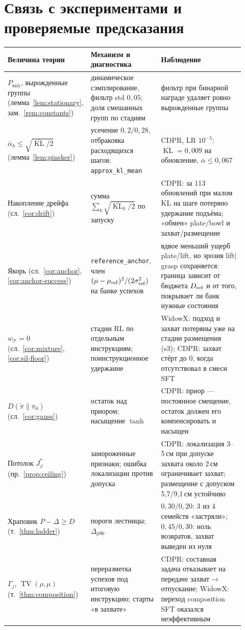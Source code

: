 \documentclass[11pt,a4paper]{article}
\theoremstyle{plain}
\theoremstyle{definition}
\theoremstyle{remark}
\DeclareMathOperator{\TV}{TV}
\DeclareMathOperator{\KL}{KL}
\newcommand{\cT}{\mathcal{T}}
\newcommand{\Pmix}{P_{\mathrm{mix}}}
\newcommand{\ab}{\bar\alpha}
\newcommand{\pit}{\tilde\pi}
\begin{document}
\section{Связь с экспериментами и проверяемые предсказания}\label{sec:experiments}

\begin{longtable}{>{\raggedright}p{0.24\linewidth}>{\raggedright}p{0.30\linewidth}>{\raggedright\arraybackslash}p{0.38\linewidth}}
\toprule
Величина теории & Механизм и диагностика & Наблюдение \\
\midrule\endhead
$\Pmix$, вырожденные группы (лемма~\ref{lem:stationary}, зам.~\ref{rem:constants}) & динамическое сэмплирование, фильтр std $0{,}05$; доля смешанных групп по стадиям & фильтр при бинарной награде удаляет ровно вырожденные группы \\
$\ab_h\le\sqrt{\overline{\KL}/2}$ (лемма~\ref{lem:pinsker}) & усечение $0{,}2/0{,}28$, отбраковка расходящихся шагов; \texttt{approx\_kl\_mean} & CDPR, LR $10^{-5}$: $\overline{\KL}=0{,}009$ на обновление, $\ab\le0{,}067$ \\
Накопление дрейфа (сл.~\ref{cor:drift}) & сумма $\sum_k\sqrt{\overline{\KL}_k/2}$ по запуску & CDPR: за 113 обновлений при малом KL на шаге потеряно удержание подъёма; «обмен» plate/bowl и захват/размещение \\
Якорь (сл.~\ref{cor:anchor}, \ref{cor:anchor-success}) & \texttt{reference\_anchor}, член $(\mu-\mu_{\rm ref})^2/(2\sigma^2_{\rm ref})$ на банке успехов & вдвое меньший ущерб plate/lift, но эрозия lift$\mid$grasp сохраняется: граница зависит от бюджета $D_{\rm ref}$ и от того, покрывает ли банк нужные состояния \\
$w_\cT=0$ (сл.~\ref{cor:mixture}, \ref{cor:sil-floor}) & стадии RL по отдельным инструкциям; поинструкционное удержание & WidowX: подход и захват потеряны уже на стадии размещения (s3); CDPR: захват стёрт до 0, когда отсутствовал в смеси SFT \\
$D(\pit\|\pi_0)$ (сл.~\ref{cor:gauss}) & остаток над приором; насыщение $\tanh$ & CDPR: приор --- постоянное смещение, остаток должен его компенсировать и насыщен \\
Потолок $J^\ast_\varphi$ (пр.~\ref{prop:ceiling}) & замороженные признаки; ошибка локализации против допуска & CDPR: локализация 3--5\,см при допуске захвата около 2\,см ограничивает захват; размещение с допуском 5,7/9,1\,см устойчиво \\
Храповик $P-\Delta\ge D$ (т.~\ref{thm:ladder}) & пороги лестницы; $\Delta_{p90}$ & $0{,}30/0{,}20$: 3 из 4 семейств «застряли»; $0{,}45/0{,}30$: ноль возвратов, захват выведен из нуля \\
$\Gamma_j$, $\TV(\rho,\mu)$ (т.~\ref{thm:composition}) & переразметка успехов под итоговую инструкцию; старты «в захвате» & CDPR: составная задача отказывает на передаче захват$\to$отпускание; WidowX: переход composition SFT оказался неэффективным \\
\bottomrule
\end{longtable}
\end{document}

